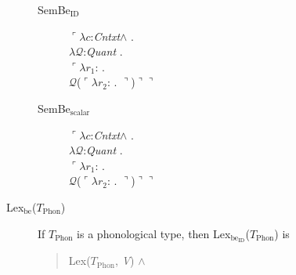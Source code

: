 \begin{description}
        \begin{description}
          
        \item[\textnormal{SemBe$_{\text{ID}}$}] \mbox{}

          $\ulcorner\lambda c$:\textit{Cntxt}\d{$\wedge$} . \\
        \hspace*{1em}$\lambda\mathcal{Q}$:\textit{Quant} . \\
        \hspace*{2em} $\ulcorner\lambda r_1$:
. \\
\hspace*{3em} $\mathcal{Q}$($\ulcorner\lambda
r_2$:
. $\urcorner$)$\urcorner\urcorner$

\item[\textnormal{SemBe$_{\text{scalar}}$}] \mbox{}

  $\ulcorner\lambda c$:\textit{Cntxt}\d{$\wedge$} . \\
        \hspace*{1em}$\lambda\mathcal{Q}$:\textit{Quant} . \\
        \hspace*{2em} $\ulcorner\lambda r_1$:
. \\
\hspace*{3em} $\mathcal{Q}$($\ulcorner\lambda
r_2$:
. $\urcorner$)$\urcorner\urcorner$

\end{description}


\item[\textnormal{Lex$_{\mathrm{be}}$($T_{\mathrm{Phon}}$)}] \mbox{}

  If $T_{\mathrm{Phon}}$ is a phonological type, then
  Lex$_{\mathrm{be}_{\text{ID}}}$($T_{\mathrm{Phon}}$) is
\begin{quote}
  Lex($T_{\mathrm{Phon}}$,
\textit{V}) \d{$\wedge$}
\end{quote}


\end{description}
